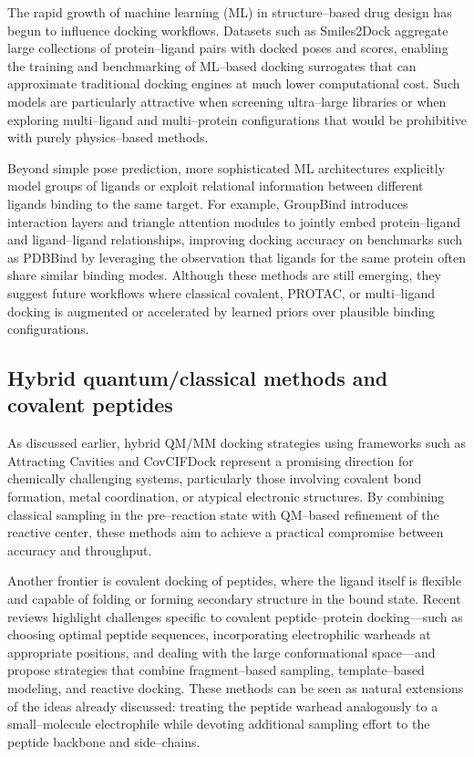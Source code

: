 \documentclass[12pt]{article}
\begin{document}
The rapid growth of machine learning (ML) in structure–based drug design has begun to influence docking workflows.  
Datasets such as Smiles2Dock aggregate large collections of protein–ligand pairs with docked poses and scores, enabling the training and benchmarking of ML–based docking surrogates that can approximate traditional docking engines at much lower computational cost.
Such models are particularly attractive when screening ultra–large libraries or when exploring multi–ligand and multi–protein configurations that would be prohibitive with purely physics–based methods.\cite{CH14_Smiles2Dock2024}

Beyond simple pose prediction, more sophisticated ML architectures explicitly model groups of ligands or exploit relational information between different ligands binding to the same target.  
For example, GroupBind introduces interaction layers and triangle attention modules to jointly embed protein–ligand and ligand–ligand relationships, improving docking accuracy on benchmarks such as PDBBind by leveraging the observation that ligands for the same protein often share similar binding modes.\cite{CH14_GroupBind2025}
Although these methods are still emerging, they suggest future workflows where classical covalent, PROTAC, or multi–ligand docking is augmented or accelerated by learned priors over plausible binding configurations.

\subsection{Hybrid quantum/classical methods and covalent peptides}

As discussed earlier, hybrid QM/MM docking strategies using frameworks such as Attracting Cavities and CovCIFDock represent a promising direction for chemically challenging systems, particularly those involving covalent bond formation, metal coordination, or atypical electronic structures.\cite{CH14_HybridQMClassDocking2025,CH14_CovCIFDock2025}
By combining classical sampling in the pre–reaction state with QM–based refinement of the reactive center, these methods aim to achieve a practical compromise between accuracy and throughput.

Another frontier is covalent docking of peptides, where the ligand itself is flexible and capable of folding or forming secondary structure in the bound state.  
Recent reviews highlight challenges specific to covalent peptide–protein docking—such as choosing optimal peptide sequences, incorporating electrophilic warheads at appropriate positions, and dealing with the large conformational space—and propose strategies that combine fragment–based sampling, template–based modeling, and reactive docking.\cite{CH14_Covpepdock} 
These methods can be seen as natural extensions of the ideas already discussed: treating the peptide warhead analogously to a small–molecule electrophile while devoting additional sampling effort to the peptide backbone and side–chains.
\end{document}
